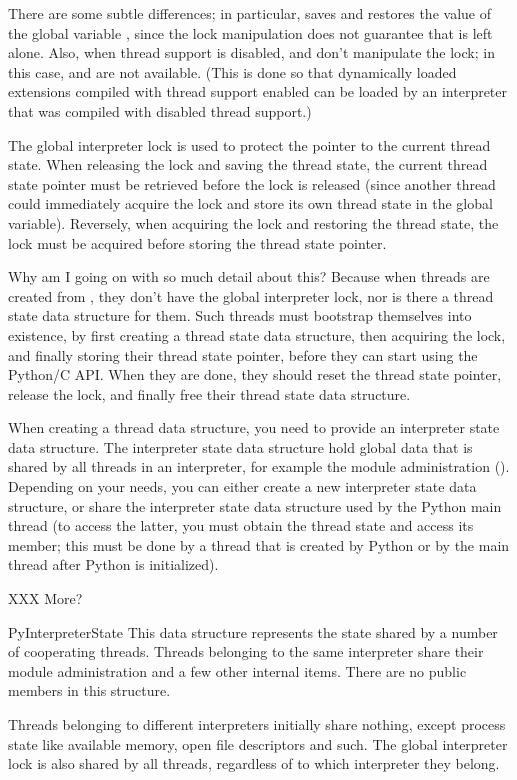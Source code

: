 \documentclass[twoside,openright]{report}
\begin{document}
There are some subtle differences; in particular,
 saves and restores the value of the
global variable , since the lock manipulation does not
guarantee that  is left alone.  Also, when thread support
is disabled,  and
 don't manipulate the lock; in this case,
 and  are not
available.  (This is done so that dynamically loaded extensions
compiled with thread support enabled can be loaded by an interpreter
that was compiled with disabled thread support.)

The global interpreter lock is used to protect the pointer to the
current thread state.  When releasing the lock and saving the thread
state, the current thread state pointer must be retrieved before the
lock is released (since another thread could immediately acquire the
lock and store its own thread state in the global variable).
Reversely, when acquiring the lock and restoring the thread state, the
lock must be acquired before storing the thread state pointer.

Why am I going on with so much detail about this?  Because when
threads are created from \C{}, they don't have the global interpreter
lock, nor is there a thread state data structure for them.  Such
threads must bootstrap themselves into existence, by first creating a
thread state data structure, then acquiring the lock, and finally
storing their thread state pointer, before they can start using the
Python/C API.  When they are done, they should reset the thread state
pointer, release the lock, and finally free their thread state data
structure.

When creating a thread data structure, you need to provide an
interpreter state data structure.  The interpreter state data
structure hold global data that is shared by all threads in an
interpreter, for example the module administration
().  Depending on your needs, you can either create
a new interpreter state data structure, or share the interpreter state
data structure used by the Python main thread (to access the latter,
you must obtain the thread state and access its  member;
this must be done by a thread that is created by Python or by the main
thread after Python is initialized).

XXX More?

\begin{ctypedesc}{PyInterpreterState}
This data structure represents the state shared by a number of
cooperating threads.  Threads belonging to the same interpreter
share their module administration and a few other internal items.
There are no public members in this structure.

Threads belonging to different interpreters initially share nothing,
except process state like available memory, open file descriptors and
such.  The global interpreter lock is also shared by all threads,
regardless of to which interpreter they belong.
\end{ctypedesc}
\end{document}
